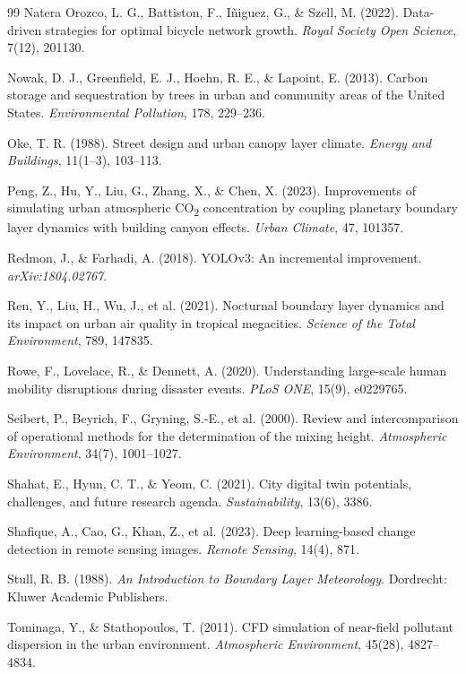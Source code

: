 \documentclass[12pt,a4paper]{article}
\begin{document}
\begin{thebibliography}{99}
Natera Orozco, L. G., Battiston, F., Iñiguez, G., \& Szell, M. (2022). Data-driven strategies for optimal bicycle network growth. \textit{Royal Society Open Science}, 7(12), 201130.

Nowak, D. J., Greenfield, E. J., Hoehn, R. E., \& Lapoint, E. (2013). Carbon storage and sequestration by trees in urban and community areas of the United States. \textit{Environmental Pollution}, 178, 229--236.

Oke, T. R. (1988). Street design and urban canopy layer climate. \textit{Energy and Buildings}, 11(1--3), 103--113.

Peng, Z., Hu, Y., Liu, G., Zhang, X., \& Chen, X. (2023). Improvements of simulating urban atmospheric CO\textsubscript{2} concentration by coupling planetary boundary layer dynamics with building canyon effects. \textit{Urban Climate}, 47, 101357.

Redmon, J., \& Farhadi, A. (2018). YOLOv3: An incremental improvement. \textit{arXiv:1804.02767}.

Ren, Y., Liu, H., Wu, J., et al. (2021). Nocturnal boundary layer dynamics and its impact on urban air quality in tropical megacities. \textit{Science of the Total Environment}, 789, 147835.

Rowe, F., Lovelace, R., \& Dennett, A. (2020). Understanding large-scale human mobility disruptions during disaster events. \textit{PLoS ONE}, 15(9), e0229765.

Seibert, P., Beyrich, F., Gryning, S.-E., et al. (2000). Review and intercomparison of operational methods for the determination of the mixing height. \textit{Atmospheric Environment}, 34(7), 1001--1027.

Shahat, E., Hyun, C. T., \& Yeom, C. (2021). City digital twin potentials, challenges, and future research agenda. \textit{Sustainability}, 13(6), 3386.

Shafique, A., Cao, G., Khan, Z., et al. (2023). Deep learning-based change detection in remote sensing images. \textit{Remote Sensing}, 14(4), 871.

Stull, R. B. (1988). \textit{An Introduction to Boundary Layer Meteorology}. Dordrecht: Kluwer Academic Publishers.

Tominaga, Y., \& Stathopoulos, T. (2011). CFD simulation of near-field pollutant dispersion in the urban environment. \textit{Atmospheric Environment}, 45(28), 4827--4834.


\end{thebibliography}
\end{document}
